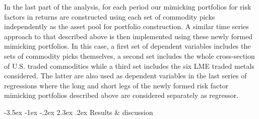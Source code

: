 \documentclass[11pt, letterpaper, doublespacing]{article}
\makeatletter
\renewcommand{\section}{\@startsection {section}{1}{\z@}%
  {-3.5ex \@plus -1ex \@minus -.2ex}%
  {2.3ex \@plus.2ex}%
  {\centering\normalfont\large\bfseries}}
\makeatother
\begin{document}
In the last part of the analysis, for each period our mimicking
portfolios for risk factors in returns are constructed using each set of
commodity picks independently as the asset pool for portfolio
construction. A similar time series approach to that described above is
then implemented using these newly formed mimicking portfolios. In this
case, a first set of dependent variables includes the sets of commodity
picks themselves, a second set includes the whole cross-section of U.S.
traded commodities while a third set includes the six LME traded metals
considered. The latter are also used as dependent variables in the last
series of regressions where the long and short legs of the newly formed
risk factor mimicking portfolios described above are considered
separately as regressor.

\section{Results \& discussion}\label{results-discussion}
\end{document}
